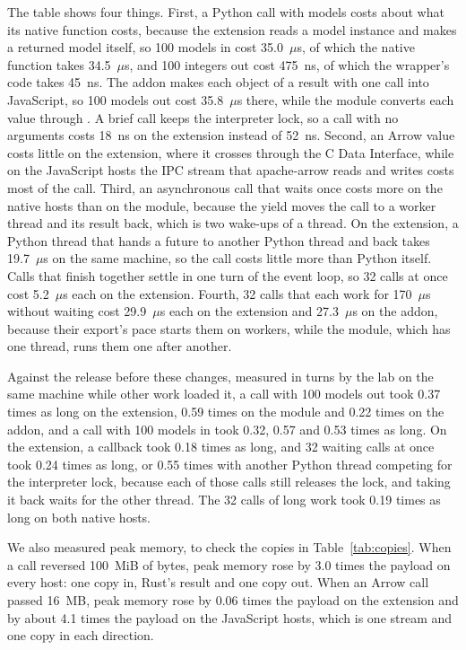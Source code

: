 \documentclass[sigconf,nonacm]{acmart}
\begin{document}
The table shows four things. First, a Python call with models costs about what its native function costs, because the extension reads a model instance and makes a returned model itself, so 100  models in cost 35.0~$\mu$s, of which the native function takes 34.5~$\mu$s, and 100 integers out cost 475~ns, of which the wrapper's code takes 45~ns. The addon makes each object of a result with one call into JavaScript, so 100 models out cost 35.8~$\mu$s there, while the module converts each value through . A brief call keeps the interpreter lock, so a call with no arguments costs 18~ns on the extension instead of 52~ns. Second, an Arrow value costs little on the extension, where it crosses through the C Data Interface, while on the JavaScript hosts the IPC stream that apache-arrow reads and writes costs most of the call. Third, an asynchronous call that waits once costs more on the native hosts than on the module, because the yield moves the call to a worker thread and its result back, which is two wake-ups of a thread. On the extension, a Python thread that hands a future to another Python thread and back takes 19.7~$\mu$s on the same machine, so the call costs little more than Python itself. Calls that finish together settle in one turn of the event loop, so 32 calls at once cost 5.2~$\mu$s each on the extension. Fourth, 32 calls that each work for 170~$\mu$s without waiting cost 29.9~$\mu$s each on the extension and 27.3~$\mu$s on the addon, because their export's pace starts them on workers, while the module, which has one thread, runs them one after another.

Against the release before these changes, measured in turns by the lab on the same machine while other work loaded it, a call with 100  models out took 0.37 times as long on the extension, 0.59 times on the module and 0.22 times on the addon, and a call with 100 models in took 0.32, 0.57 and 0.53 times as long. On the extension, a callback took 0.18 times as long, and 32 waiting calls at once took 0.24 times as long, or 0.55 times with another Python thread competing for the interpreter lock, because each of those calls still releases the lock, and taking it back waits for the other thread. The 32 calls of long work took 0.19 times as long on both native hosts.

We also measured peak memory, to check the copies in Table~\ref{tab:copies}. When a call reversed 100~MiB of bytes, peak memory rose by 3.0 times the payload on every host: one copy in, Rust's result and one copy out. When an Arrow call passed 16~MB, peak memory rose by 0.06 times the payload on the extension and by about 4.1 times the payload on the JavaScript hosts, which is one stream and one copy in each direction.
\end{document}
